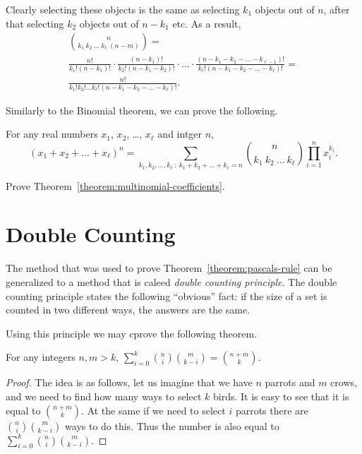 Clearly selecting these objects is the same as selecting $k_1$ objects out of
$n$, after that selecting $k_2$ objects out of $n - k_1$ etc. As a result,
\begin{multline*}
  \binom{n}{k_1 \ k_2 \ \dots \ k_\ell \ (n - m)} = \\
  \frac{n!}{k_1! (n - k_1)!} \cdot \frac{(n - k_1)!}{k_2! (n - k_1 - k_2)!}
  \cdot \ldots \cdot
  \frac{
    (n - k_1 - k_2 - \dots - k_{\ell - 1})!
  }{
    k_\ell! (n - k_1 - k_2 - \dots - k_\ell)!
  } = \\
  \frac{n!}{k_1! k_2! \dots k_\ell! (n - k_1 - k_2 - \dots - k_\ell)!}.
\end{multline*}

Similarly to the Binomial theorem, we can prove the following.
\begin{theorem}
\label{theorem:multinomial-coefficients}
  For any real numbers $x_1$, $x_2$, \dots, $x_\ell$ and intger $n$,
  \[
    (x_1 + x_2 + \dots + x_\ell)^n =
    \sum_{k_1, k_2, \dots, k_\ell ~:~ k_1 + k_2 + \dots + k_\ell = n}
      \binom{n}{k_1 \ k_2 \ \dots \ k_\ell} \prod_{i = 1}^n x_i^{k_i}.
  \]
\end{theorem}

\begin{exercise}
  Prove Theorem~\ref{theorem:multinomial-coefficients}.
\end{exercise}

\section{Double Counting}
The method that was used to prove Theorem~\ref{theorem:pascals-rule} can be
generalized to a method that is caleed \emph{double counting principle}.
The double counting principle states the following “obvious” fact: if the
size of a set is counted in two different ways, the answers are the same.

Using this principle we may cprove the following theorem.
\begin{theorem}
  For any integers $n, m > k$,
  $\sum_{i = 0}^k \binom{n}{i} \binom{m}{k - i} = \binom{n + m}{k}$.
\end{theorem}
\begin{proof}
  The idea is as follows, let us imagine that we have $n$ parrots and $m$ crows,
  and we need to find how many ways to select $k$ birds.
  It is easy to see that it is equal to $\binom{n + m}{k}$. At the same
  if we need to select $i$ parrots there are $\binom{n}{i}\binom{m}{k - i}$
  ways to do this. Thus the number is also equal to
  $\sum_{i = 0}^k \binom{n}{i}\binom{m}{k - i}$.
\end{proof}


